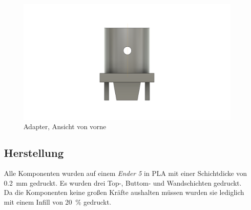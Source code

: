 \begin{figure}[H]
  \centering
  \includegraphics[width=\textwidth]{./img/ST_Adapterv4_front}
  \caption{Adapter, Ansicht von vorne}\label{fig:adapter_front}
\end{figure}
\subsection{Herstellung}\label{sec:ge_herst}
Alle Komponenten wurden auf einem \emph{Ender 5} in PLA mit einer Schichtdicke von \SI{0.2}{\milli\meter} gedruckt. Es wurden drei Top-, Buttom- und Wandschichten gedruckt. Da die Komponenten keine großen Kräfte aushalten müssen wurden sie lediglich mit einem Infill von \SI{20}{\percent} gedruckt.
